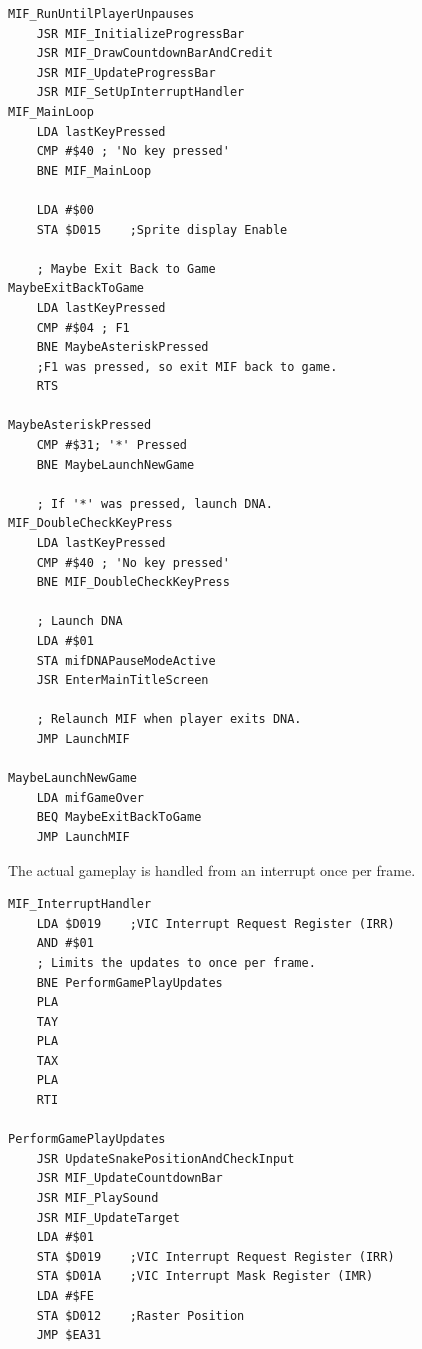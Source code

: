 \begin{lstlisting}
MIF_RunUntilPlayerUnpauses   
    JSR MIF_InitializeProgressBar
    JSR MIF_DrawCountdownBarAndCredit
    JSR MIF_UpdateProgressBar
    JSR MIF_SetUpInterruptHandler
MIF_MainLoop
    LDA lastKeyPressed
    CMP #$40 ; 'No key pressed'
    BNE MIF_MainLoop

    LDA #$00
    STA $D015    ;Sprite display Enable

    ; Maybe Exit Back to Game
MaybeExitBackToGame
    LDA lastKeyPressed
    CMP #$04 ; F1
    BNE MaybeAsteriskPressed
    ;F1 was pressed, so exit MIF back to game.
    RTS 

MaybeAsteriskPressed
    CMP #$31; '*' Pressed
    BNE MaybeLaunchNewGame

    ; If '*' was pressed, launch DNA.
MIF_DoubleCheckKeyPress
    LDA lastKeyPressed
    CMP #$40 ; 'No key pressed'
    BNE MIF_DoubleCheckKeyPress

    ; Launch DNA
    LDA #$01
    STA mifDNAPauseModeActive
    JSR EnterMainTitleScreen

    ; Relaunch MIF when player exits DNA.
    JMP LaunchMIF

MaybeLaunchNewGame
    LDA mifGameOver
    BEQ MaybeExitBackToGame
    JMP LaunchMIF
\end{lstlisting}

The actual gameplay is handled from an interrupt once per frame.

\begin{lstlisting}
MIF_InterruptHandler   
    LDA $D019    ;VIC Interrupt Request Register (IRR)
    AND #$01
    ; Limits the updates to once per frame.
    BNE PerformGamePlayUpdates
    PLA 
    TAY 
    PLA 
    TAX 
    PLA 
    RTI 

PerformGamePlayUpdates
    JSR UpdateSnakePositionAndCheckInput
    JSR MIF_UpdateCountdownBar
    JSR MIF_PlaySound
    JSR MIF_UpdateTarget
    LDA #$01
    STA $D019    ;VIC Interrupt Request Register (IRR)
    STA $D01A    ;VIC Interrupt Mask Register (IMR)
    LDA #$FE
    STA $D012    ;Raster Position
    JMP $EA31
\end{lstlisting}


